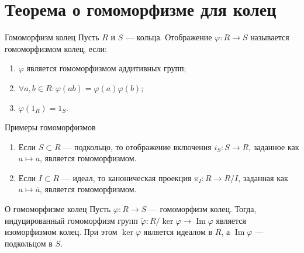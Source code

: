 
\section{Теорема о гомоморфизме для колец}

\begin{Definition}{Гомоморфизм колец}{}
	Пусть $R$ и $S$ --- кольца. Отображение $\varphi\colon R \to S$ называется гомоморфизмом колец, если:
	\begin{enumerate}
		\item $\varphi$ является гомоморфизмом аддитивных групп;
		\item $\forall a, b \in R \colon \varphi(ab) = \varphi(a)\varphi(b)$;
		\item $\varphi(1_R) = 1_S$.
	\end{enumerate}
\end{Definition}

\begin{Example}{Примеры гомоморфизмов}{}
	\begin{enumerate}
		\item Если $S \subset R$ --- подкольцо, то отображение включения $i_S\colon S \to R$, заданное как $a \mapsto a$, является гомоморфизмом.
		\item Если $I \subset R$ --- идеал, то каноническая проекция $\pi_I\colon R \to R/I$, заданная как $a \mapsto \bar{a}$, является гомоморфизмом.
	\end{enumerate}
\end{Example}

\begin{Theorem}{О гомоморфизме колец}{}
	Пусть $\varphi\colon R \to S$ --- гомоморфизм колец. Тогда, индуцированный гомоморфизм групп $\tilde{\varphi}\colon R/\ker\varphi \to \operatorname{Im}\varphi$ является изоморфизмом колец. При этом $\ker\varphi$ является идеалом в $R$, а $\operatorname{Im}\varphi$ --- подкольцом в $S$.
\end{Theorem}


